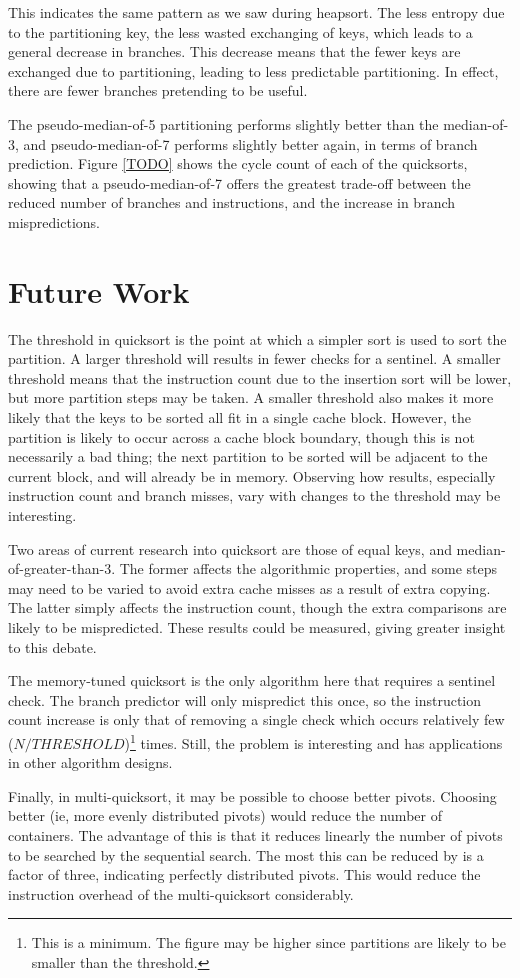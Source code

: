 This indicates the same pattern as we saw during heapsort.%
The less entropy due to the partitioning key, the less wasted exchanging of keys,
which leads to a general decrease in branches. This decrease means that the
fewer keys are exchanged due to partitioning, leading to less predictable
partitioning. In effect, there are fewer branches pretending to be useful.

The pseudo-median-of-5 partitioning performs slightly better than the
median-of-3, and pseudo-median-of-7 performs slightly better again, in
terms of branch prediction. Figure \ref{TODO} shows the cycle count of each of
the quicksorts, showing that a pseudo-median-of-7 offers the greatest
trade-off between the reduced number of branches and instructions, and the
increase in branch mispredictions. 



\section{Future Work}
The threshold in quicksort is the point at which a simpler sort is used to sort
the partition. A larger threshold will results in fewer checks for a sentinel. A
smaller threshold means that the instruction count due to the insertion sort
will be lower, but more partition steps may be taken. A smaller threshold also
makes it more likely that the keys to be sorted all fit in a single cache
block. However, the partition is likely to occur across a cache block boundary,
though this is not necessarily a bad thing; the next partition to be sorted will
be adjacent to the current block, and will already be in memory. Observing how
results, especially instruction count and branch misses, vary with changes 
to the threshold may be interesting.

Two areas of current research into quicksort are those of equal keys, and
median-of-greater-than-3. The former affects the algorithmic properties, and
some steps may need to be varied to avoid extra cache misses as a result
of extra copying. The latter simply affects the instruction count, though the
extra comparisons are likely to be mispredicted. These results could be
measured, giving greater insight to this debate.

The memory-tuned quicksort is the only algorithm here that requires a sentinel
check. The branch predictor will only mispredict this once, so the instruction
count increase is only that of removing a single check which occurs relatively
few ($N / THRESHOLD$)\footnote{This is a minimum. The figure may be higher since
partitions are likely to be smaller than the threshold.} times. Still, the
problem is interesting and has applications in other algorithm designs.

Finally, in multi-quicksort, it may be possible to choose better pivots.
Choosing better (ie, more evenly distributed pivots) would reduce the number of
containers. The advantage of this is that it reduces linearly the number of
pivots to be searched by the sequential search. The most this can be reduced by
is a factor of three, indicating perfectly distributed pivots. This would reduce
the instruction overhead of the multi-quicksort considerably.
